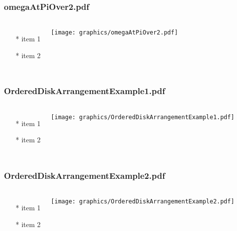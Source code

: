 \begin{frame} \frametitle{omegaAtPiOver2.pdf}
    \begin{columns}[c]
        \begin{itemize}
            \item[*] item 1
            \item[*] item 2
        \end{itemize}
        \begin{minipage}{\linewidth}
            \begin{center}
            \texttt{[image: graphics/omegaAtPiOver2.pdf]}
            \label{gfx:omegaAtPiOver2.pdf}
            \end{center}
        \end{minipage}
    \end{columns}
\end{frame}
\begin{frame} \frametitle{OrderedDiskArrangementExample1.pdf}
    \begin{columns}[c]
        \begin{itemize}
            \item[*] item 1
            \item[*] item 2
        \end{itemize}
        \begin{minipage}{\linewidth}
            \begin{center}
            \texttt{[image: graphics/OrderedDiskArrangementExample1.pdf]}
            \label{gfx:OrderedDiskArrangementExample1.pdf}
            \end{center}
        \end{minipage}
    \end{columns}
\end{frame}
\begin{frame} \frametitle{OrderedDiskArrangementExample2.pdf}
    \begin{columns}[c]
        \begin{itemize}
            \item[*] item 1
            \item[*] item 2
        \end{itemize}
        \begin{minipage}{\linewidth}
            \begin{center}
            \texttt{[image: graphics/OrderedDiskArrangementExample2.pdf]}
            \label{gfx:OrderedDiskArrangementExample2.pdf}
            \end{center}
        \end{minipage}
    \end{columns}
\end{frame}
